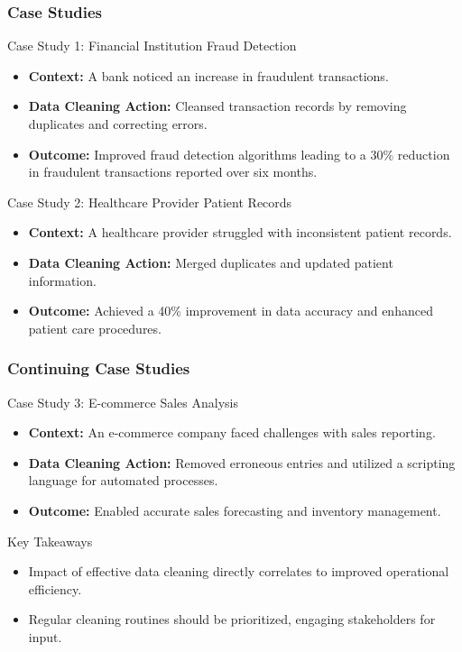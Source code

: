 \documentclass[aspectratio=169]{beamer}
\begin{document}
\begin{frame}[fragile]
    \frametitle{Case Studies}
    \begin{block}{Case Study 1: Financial Institution Fraud Detection}
        \begin{itemize}
            \item \textbf{Context:} A bank noticed an increase in fraudulent transactions.
            \item \textbf{Data Cleaning Action:} Cleansed transaction records by removing duplicates and correcting errors.
            \item \textbf{Outcome:} Improved fraud detection algorithms leading to a 30\% reduction in fraudulent transactions reported over six months.
        \end{itemize}
    \end{block}
    
    \begin{block}{Case Study 2: Healthcare Provider Patient Records}
        \begin{itemize}
            \item \textbf{Context:} A healthcare provider struggled with inconsistent patient records.
            \item \textbf{Data Cleaning Action:} Merged duplicates and updated patient information.
            \item \textbf{Outcome:} Achieved a 40\% improvement in data accuracy and enhanced patient care procedures.
        \end{itemize}
    \end{block}
\end{frame}

\begin{frame}[fragile]
    \frametitle{Continuing Case Studies}
    \begin{block}{Case Study 3: E-commerce Sales Analysis}
        \begin{itemize}
            \item \textbf{Context:} An e-commerce company faced challenges with sales reporting.
            \item \textbf{Data Cleaning Action:} Removed erroneous entries and utilized a scripting language for automated processes.
            \item \textbf{Outcome:} Enabled accurate sales forecasting and inventory management.
        \end{itemize}
    \end{block}

    \begin{block}{Key Takeaways}
        \begin{itemize}
            \item Impact of effective data cleaning directly correlates to improved operational efficiency.
            \item Regular cleaning routines should be prioritized, engaging stakeholders for input.
        \end{itemize}
    \end{block}
\end{frame}
\end{document}
